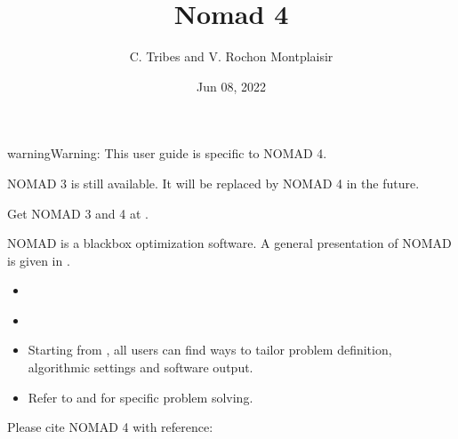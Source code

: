 \documentclass[letterpaper,10pt,english]{sphinxmanual}
\title{Nomad 4}
\date{Jun 08, 2022}
\author{C.\@{} Tribes and V.\@{} Rochon Montplaisir}
\begin{document}
\pagestyle{empty}
\sphinxmaketitle
\pagestyle{plain}
\sphinxtableofcontents
\pagestyle{normal}
\label{\detokenize{index::doc}}


\begin{sphinxadmonition}{warning}{Warning:}
\sphinxAtStartPar
This user guide is specific to NOMAD 4.

\sphinxAtStartPar
NOMAD 3 is still available. It will be replaced by NOMAD 4 in the future.

\sphinxAtStartPar
Get NOMAD 3 and 4 at .
\end{sphinxadmonition}

\sphinxAtStartPar
NOMAD is a blackbox optimization software. A general presentation of NOMAD is given in {\hyperref[\detokenize{Introduction:introduction}]{}}.

\sphinxAtStartPar
{}
\begin{itemize}
\item {} 
\sphinxAtStartPar
{\hyperref[\detokenize{Installation:installation}]{}}

\item {} 
\sphinxAtStartPar
{\hyperref[\detokenize{GettingStarted:getting-started}]{}}

\end{itemize}

\sphinxAtStartPar
{}
\begin{itemize}
\item {} 
\sphinxAtStartPar
Starting from {\hyperref[\detokenize{HowToUseNomad:basic-nomad-usage}]{}}, all users can find ways to tailor problem definition, algorithmic settings and software output.

\item {} 
\sphinxAtStartPar
Refer to {\hyperref[\detokenize{AdvancedFunctionalities:advanced-functionalities}]{}} and {\hyperref[\detokenize{TricksOfTheTrade:tricks-of-the-trade}]{}} for specific problem solving.

\end{itemize}

\sphinxAtStartPar
Please cite NOMAD 4 with reference:
\end{document}
